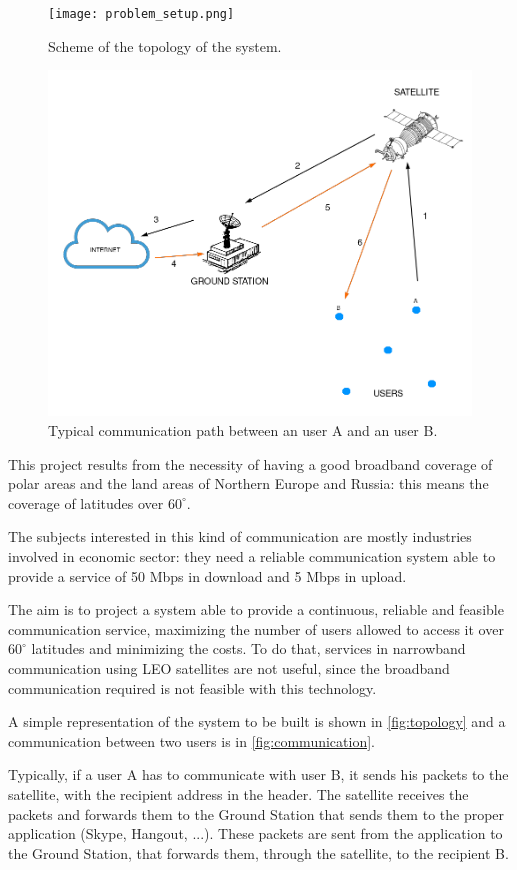 \begin{figure}
	\centering
	\begin{minipage}{0.37\textwidth}
		\texttt{[image: problem\_setup.png]}
		\caption{Scheme of the topology of the system.}
		\label{fig:topology}
	\end{minipage}\hspace{0.5cm}
	\begin{minipage}{0.45\textwidth}
		\includegraphics[width=\textwidth]{figures/System_topology_noBG.png}
		\caption{Typical communication path between an user A and an user B.}
		\label{fig:communication}
	\end{minipage}
\end{figure}

This project results from the necessity of having a good broadband coverage of polar
areas and the land areas of Northern Europe and Russia: this means the coverage of
latitudes over $60^\circ$.

The subjects interested in this kind of communication are
mostly industries involved in economic sector: they need a reliable communication system able to provide a service of 50 Mbps in download and 5 Mbps in upload.


The aim is to project a system able to provide a continuous, reliable and feasible communication service, maximizing the number of users allowed to access it over $60^\circ$
latitudes and minimizing the costs. To do that, services in narrowband communication using LEO satellites are not useful, since the broadband communication required is not feasible with this technology.

A simple representation of the system to be built is shown in \autoref{fig:topology} and a communication between two users is in \autoref{fig:communication}.

Typically, if a user A has to communicate with user B, it sends his packets to the satellite, with the recipient address in the header.
The satellite receives the packets and forwards them to the Ground Station that sends them to the proper application (Skype, Hangout, ...).
These packets are sent from the application to the Ground Station, that forwards them, through the satellite, to the recipient B.

